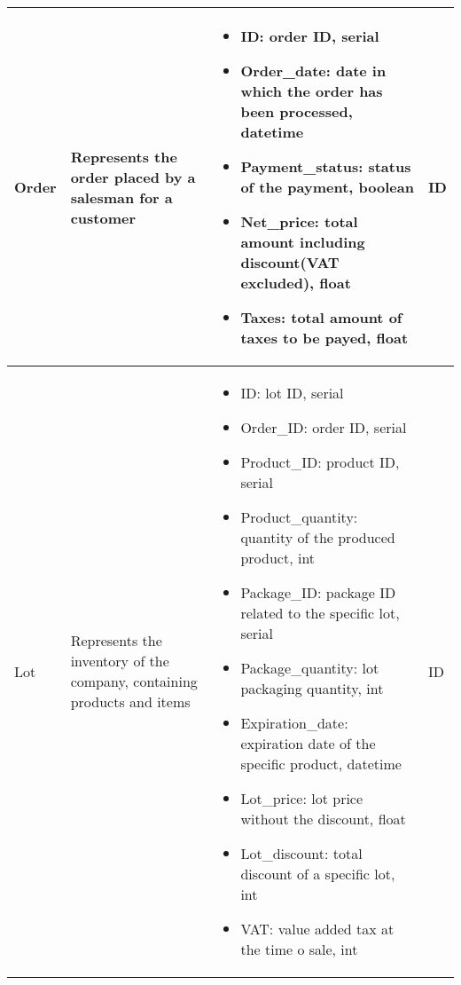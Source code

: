 \begin{longtable}{|p{}|p{} |p{}|p{} |}
    Order & Represents the order placed by a salesman for a customer &
    \begin{itemize}
        \vspace{-1em}
        \item ID:   order ID, serial
        \item Order\_date:   date in which the order has been processed, datetime
        \item Payment\_status:   status of the payment, boolean
        \item Net\_price:   total amount including discount(VAT excluded), float    %
        \item Taxes:   total amount of taxes to be payed, float                     %
    \end{itemize}
    &  ID \\\hline

    Lot & Represents the inventory of the company, containing products and items &
    \begin{itemize}
        \vspace{-1em}
        \item ID:   lot ID, serial
        \item Order\_ID:   order ID, serial     %
        \item Product\_ID:   product ID, serial
        \item Product\_quantity:   quantity of the produced product, int
        \item Package\_ID:   package ID related to the specific lot, serial
        \item Package\_quantity:   lot packaging quantity, int
        \item Expiration\_date:   expiration date of the specific product, datetime
        \item Lot\_price:   lot price without the discount, float
        \item Lot\_discount:   total discount of a specific lot, int
        \item VAT:   value added tax at the time o sale, int
    \end{itemize}
    &  ID \\\hline


\end{longtable}
